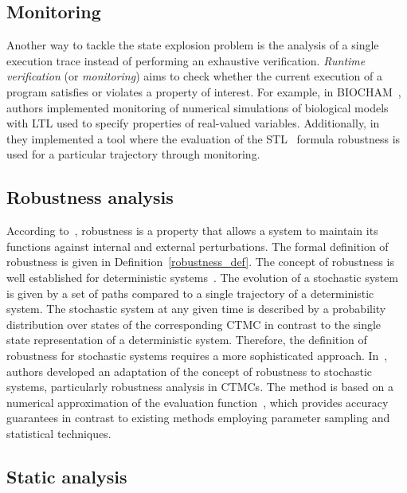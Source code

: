 \documentclass[11pt,a4paper]{report}
\begin{document}
\subsection{Monitoring}

Another way to tackle the state explosion problem is the analysis of a single execution trace instead of performing an exhaustive verification. \emph{Runtime verification} (or \emph{monitoring}) aims to check whether the current execution of a program satisfies or violates a property of interest. For example, in BIOCHAM~\cite{calzone2006biocham}, authors implemented monitoring of numerical simulations of biological models with LTL used to specify properties of real-valued variables. Additionally, in~\cite{donze2010breach} they implemented a tool where the evaluation of the STL~\cite{maler2004monitoring} formula robustness is used for a particular trajectory through monitoring.

\subsection{Robustness analysis}

According to~\cite{kitano2004biological}, robustness is a property that allows a system to maintain its functions against internal and external perturbations. The formal definition of robustness is given in Definition~\ref{robustness_def}. The concept of robustness is well established for deterministic systems~\cite{donze2011robustness,rizk2009general}. The evolution of a stochastic system is given
by a set of paths compared to a single trajectory of a deterministic system. The stochastic system at any given time is described by a probability distribution over states of the corresponding CTMC in contrast to the single state representation of a deterministic system. Therefore, the definition of robustness for stochastic systems requires a more sophisticated approach. In~\cite{vceska2014robustness}, authors developed an adaptation of the concept of robustness to stochastic systems, particularly robustness analysis in CTMCs. The method is based on a numerical approximation of the evaluation function~\cite{brim2013exploring}, which provides accuracy guarantees in contrast to existing methods employing parameter sampling and statistical techniques.

\subsection{Static analysis}\label{static_analysis}
\end{document}

